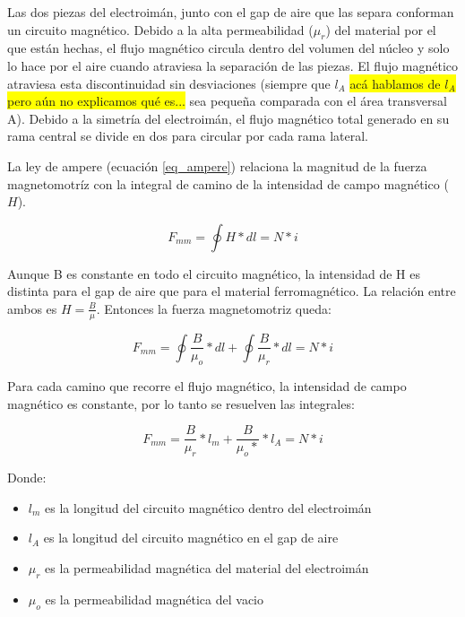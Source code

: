\noindent Las dos piezas del electroimán, junto con el gap de aire que las separa conforman un circuito magnético. Debido a la alta permeabilidad ($\mu_{r}$) del material por el que están hechas, el flujo magnético circula dentro del volumen del núcleo y solo lo hace por el aire cuando atraviesa la separación de las piezas. El flujo magnético atraviesa esta discontinuidad sin desviaciones (siempre que $l_{A}$ \colorbox{yellow}{acá hablamos de $l_{A}$ pero aún no explicamos qué es...} sea pequeña comparada con el área transversal A). 
\noindent Debido a la simetría del electroimán, el flujo magnético total generado en su rama central se divide en dos para circular por cada rama lateral.

\noindent La ley de ampere (ecuación \ref{eq_ampere}) relaciona la magnitud de la fuerza magnetomotríz con la integral de camino de la intensidad de campo magnético ($H$).

\begin{equation} \label{eq_ampere}
	F_{mm}=\oint{H*dl}=N*i
\end{equation}

\noindent Aunque B es constante en todo el circuito magnético, la intensidad de H es distinta para el gap de aire que para el material ferromagnético. La relación entre ambos es $H=\frac{B}{\mu}$. Entonces la fuerza magnetomotriz queda:

\begin{equation} 
	F_{mm}=\oint{\frac{B}{\mu_{o}}*dl}+\oint{\frac{B}{\mu_{r}}*dl}=N*i
\end{equation}

\noindent Para cada camino que recorre el flujo magnético, la intensidad de campo magnético es constante, por lo tanto se resuelven las integrales:

\begin{equation}
	F_{mm}=\frac{B}{\mu_{r}}*l_{m}+\frac{B}{\mu_{o}*}*l_{A}=N*i
\end{equation}

Donde:
\begin{itemize}
	\item $l_{m}$ es la longitud del circuito magnético dentro del electroimán
	\item $l_{A}$ es la longitud del circuito magnético en el gap de aire
	\item $\mu_{r}$ es la permeabilidad magnética del material del electroimán
	\item $\mu_{o}$ es la permeabilidad magnética del vacio
\end{itemize}

